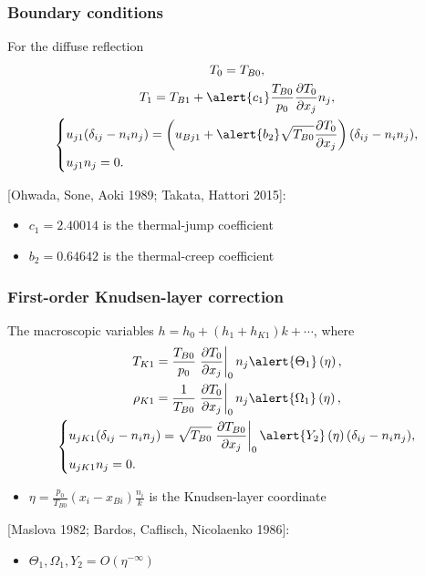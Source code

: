 \documentclass[mathserif]{beamer} %
\newcommand{\pder}[2][]{\frac{\partial#1}{\partial#2}}
\newcommand{\OO}[1]{O(#1)}
\begin{document}
\begin{frame}
    \frametitle{Boundary conditions}
    For the diffuse reflection
    \begin{gather}
        T_0 = T_{B0}, \label{eq:bc_T0} \\
        T_1 = T_{B1} + \alert{c_1} \frac{T_{B0}}{p_0}\pder[T_0]{x_j} n_j, \label{eq:bc_T1} \\
        \left\{
        \begin{aligned}
            & u_{j1} (\delta_{ij}-n_in_j) =
                \left(u_{Bj1} + \alert{b_2} \sqrt{T_{B0}} \pder[T_0]{x_j}\right) (\delta_{ij}-n_in_j), \\
            & u_{j1} n_j = 0.
        \end{aligned}
        \right. \label{eq:bc_u1}
    \end{gather}
    \vspace{10pt}

    [Ohwada, Sone, Aoki 1989; Takata, Hattori 2015]:
    \begin{itemize}
        \item \(c_1 = 2.40014\) is the thermal-jump coefficient
        \item \(b_2 = 0.64642\) is the thermal-creep coefficient
    \end{itemize}
\end{frame}

\begin{frame}
    \frametitle{First-order Knudsen-layer correction}
    The macroscopic variables \(h = h_0 + (h_1 + h_{K1})k + \cdots\), where
    \begin{gather}
        T_{K1} = \frac{T_{B0}}{p_0}\left.\pder[T_0]{x_j}\right|_0 n_j
            \alert{ \Theta_1 }\left(\eta\right), \label{eq:correction_T} \\
        \rho_{K1} = \frac1{T_{B0}}\left.\pder[T_0]{x_j}\right|_0 n_j
            \alert{ \Omega_1 }\left(\eta\right), \label{eq:correction_rho} \\
        \left\{
        \begin{aligned}
            & u_{jK1} (\delta_{ij}-n_in_j) =
                \sqrt{T_{B0}} \left.\pder[T_{B0}]{x_j}\right|_0
                \alert{ Y_2 }\left(\eta\right) (\delta_{ij}-n_in_j), \\
            & u_{jK1} n_j = 0.
        \end{aligned}
        \right. \label{eq:correction_u}
    \end{gather}
    \vspace{-20pt}
    \begin{itemize}
        \item \(\eta = \frac{p_0}{T_{B0}}(x_i-x_{Bi})\frac{n_i}k\) is the Knudsen-layer coordinate
    \end{itemize}
    [Maslova 1982; Bardos, Caflisch, Nicolaenko 1986]:
    \begin{itemize}
        \item \(\Theta_1, \Omega_1, Y_2 = \OO{\eta^{-\infty}}\)
    \end{itemize}
\end{frame}
\end{document}
